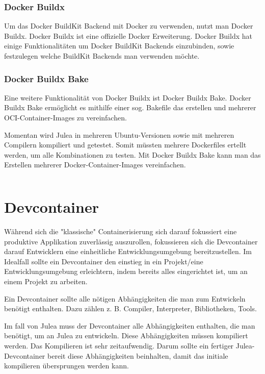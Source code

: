 \subsubsection{Docker Buildx}

Um das Docker BuildKit Backend mit Docker zu verwenden, nutzt man Docker Buildx. Docker Buildx ist eine offizielle Docker Erweiterung. Docker Buildx hat einige Funktionalitäten um Docker BuildKit Backends einzubinden, sowie festzulegen welche BuildKit Backends man verwenden möchte.

\subsubsection{Docker Buildx Bake}

Eine weitere Funktionalität von Docker Buildx ist Docker Buildx Bake. Docker Buildx Bake ermöglicht es mithilfe einer sog. Bakefile das erstellen und mehrerer OCI-Container-Images zu vereinfachen.

Momentan wird Julea in mehreren Ubuntu-Versionen sowie mit mehreren Compilern kompiliert und getestet. Somit müssten mehrere Dockerfiles ertellt werden, um alle Kombinationen zu testen. Mit Docker Buildx Bake kann man das Erstellen mehrerer Docker-Container-Images vereinfachen.

\inputminted{./lexers/docker-bake-lexer.py}{./code-examples/docker-bake.example.hcl}

\section{Devcontainer}

Während sich die "klassische" Containerisierung sich darauf fokussiert eine produktive Applikation zuverlässig auszurollen, fokussieren sich die Devcontainer darauf Entwicklern eine einheitliche Entwicklungsumgebung bereitzustellen. Im Idealfall sollte ein Devcontainer den einstieg in ein Projekt/eine Entwicklungsumgebung erleichtern, indem bereits alles eingerichtet ist, um an einem Projekt zu arbeiten.

Ein Devcontainer sollte alle nötigen Abhängigkeiten die man zum Entwickeln benötigt enthalten. Dazu zählen z. B. Compiler, Interpreter, Bibliotheken, Tools.

Im fall von Julea muss der Devcontainer alle Abhängigkeiten enthalten, die man benötigt, um an Julea zu entwickeln. Diese Abhängigkeiten müssen kompiliert werden. Das Kompilieren ist sehr zeitaufwendig. Darum sollte ein fertiger Julea-Devcontainer bereit diese Abhängigkeiten beinhalten, damit das initiale kompilieren übersprungen werden kann.

